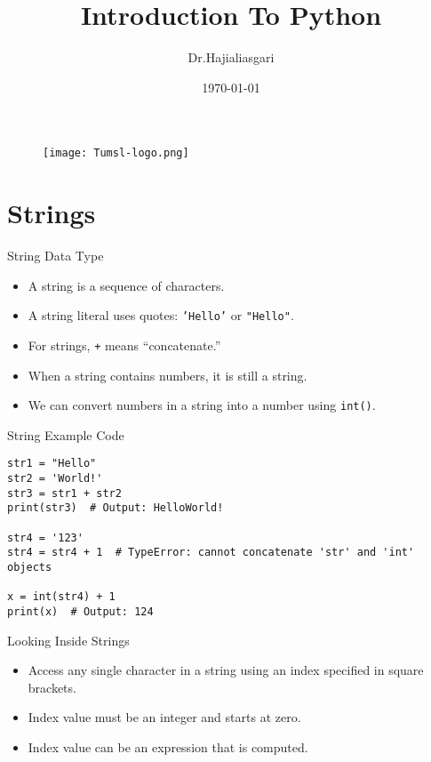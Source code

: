 \documentclass[serif, aspectratio=169]{beamer}
\author{Dr.Hajialiasgari}
\title{Introduction To Python}
\institute{
    Tehran University \\
    Of\\
    Medical Science
}
\date{\small \today}
\begin{document}
\begin{frame}
    \titlepage
    \vspace*{-0.6cm}
    \begin{figure}[htpb]
        \begin{center}
            \texttt{[image: Tumsl-logo.png]}
        \end{center}
    \end{figure}
\end{frame}

\begin{frame}    
\tableofcontents[sectionstyle=show, subsectionstyle=show/shaded/hide, subsubsectionstyle=show/shaded/hide]
\end{frame}

\section{Strings}

\begin{frame}{String Data Type}
    \begin{itemize}
        \item A string is a sequence of characters.
        \item A string literal uses quotes: \texttt{'Hello'} or \texttt{"Hello"}.
        \item For strings, \texttt{+} means “concatenate.”
        \item When a string contains numbers, it is still a string.
        \item We can convert numbers in a string into a number using \texttt{int()}.
    \end{itemize}
\end{frame}

\begin{frame}[fragile]{String Example Code}
    \begin{lstlisting}
str1 = "Hello"
str2 = 'World!'
str3 = str1 + str2
print(str3)  # Output: HelloWorld!

str4 = '123'
str4 = str4 + 1  # TypeError: cannot concatenate 'str' and 'int' objects

x = int(str4) + 1
print(x)  # Output: 124
    \end{lstlisting}
\end{frame}

\begin{frame}{Looking Inside Strings}
    \begin{itemize}
        \item Access any single character in a string using an index specified in square brackets.
        \item Index value must be an integer and starts at zero.
        \item Index value can be an expression that is computed.
    \end{itemize}
\end{frame}
\end{document}
